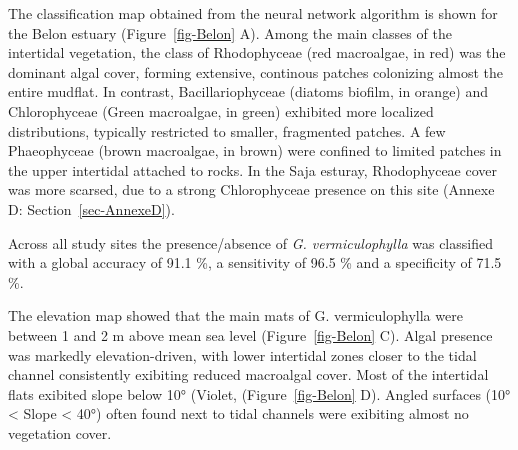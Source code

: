 \documentclass[
  letterpaper,
  11pt,
  english,
  singlespacing,
  headsepline]{MastersDoctoralThesis}
\begin{document}
\begin{spacing}{1.5}
The classification map obtained from the neural network algorithm is
shown for the Belon estuary (Figure~\ref{fig-Belon} A). Among the main
classes of the intertidal vegetation, the class of Rhodophyceae (red
macroalgae, in red) was the dominant algal cover, forming extensive,
continous patches colonizing almost the entire mudflat. In contrast,
Bacillariophyceae (diatoms biofilm, in orange) and Chlorophyceae (Green
macroalgae, in green) exhibited more localized distributions, typically
restricted to smaller, fragmented patches. A few Phaeophyceae (brown
macroalgae, in brown) were confined to limited patches in the upper
intertidal attached to rocks. In the Saja esturay, Rhodophyceae cover
was more scarsed, due to a strong Chlorophyceae presence on this site
(Annexe D: Section~\ref{sec-AnnexeD}).

Across all study sites the presence/absence of \emph{G. vermiculophylla}
was classified with a global accuracy of 91.1 \%, a sensitivity of 96.5
\% and a specificity of 71.5 \%.

The elevation map showed that the main mats of G. vermiculophylla were
between 1 and 2 m above mean sea level (Figure~\ref{fig-Belon} C). Algal
presence was markedly elevation-driven, with lower intertidal zones
closer to the tidal channel consistently exibiting reduced macroalgal
cover. Most of the intertidal flats exibited slope below 10° (Violet,
(Figure~\ref{fig-Belon} D). Angled surfaces (10° \textless{} Slope
\textless{} 40°) often found next to tidal channels were exibiting
almost no vegetation cover.

\begin{figure}

\centering{

}
\end{figure}
\end{spacing}
\end{document}
